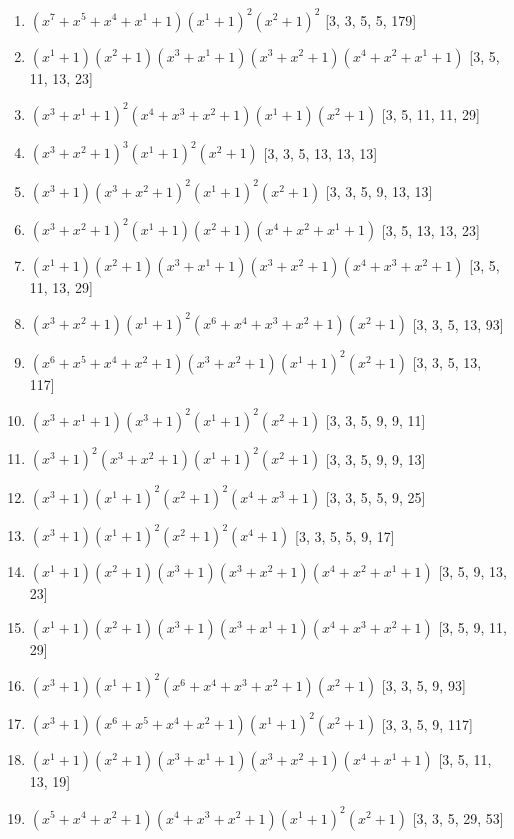 \documentclass[10pt,twocolumn]{article}
\begin{document}
\begin{enumerate}
\item $(x^{7} + x^{5} + x^{4} + x^{1} + 1)(x^{1} + 1)^{2}(x^{2} + 1)^{2}$  [3, 3, 5, 5, 179]
\item $(x^{1} + 1)(x^{2} + 1)(x^{3} + x^{1} + 1)(x^{3} + x^{2} + 1)(x^{4} + x^{2} + x^{1} + 1)$  [3, 5, 11, 13, 23]
\item $(x^{3} + x^{1} + 1)^{2}(x^{4} + x^{3} + x^{2} + 1)(x^{1} + 1)(x^{2} + 1)$  [3, 5, 11, 11, 29]
\item $(x^{3} + x^{2} + 1)^{3}(x^{1} + 1)^{2}(x^{2} + 1)$  [3, 3, 5, 13, 13, 13]
\item $(x^{3} + 1)(x^{3} + x^{2} + 1)^{2}(x^{1} + 1)^{2}(x^{2} + 1)$  [3, 3, 5, 9, 13, 13]
\item $(x^{3} + x^{2} + 1)^{2}(x^{1} + 1)(x^{2} + 1)(x^{4} + x^{2} + x^{1} + 1)$  [3, 5, 13, 13, 23]
\item $(x^{1} + 1)(x^{2} + 1)(x^{3} + x^{1} + 1)(x^{3} + x^{2} + 1)(x^{4} + x^{3} + x^{2} + 1)$  [3, 5, 11, 13, 29]
\item $(x^{3} + x^{2} + 1)(x^{1} + 1)^{2}(x^{6} + x^{4} + x^{3} + x^{2} + 1)(x^{2} + 1)$  [3, 3, 5, 13, 93]
\item $(x^{6} + x^{5} + x^{4} + x^{2} + 1)(x^{3} + x^{2} + 1)(x^{1} + 1)^{2}(x^{2} + 1)$  [3, 3, 5, 13, 117]
\item $(x^{3} + x^{1} + 1)(x^{3} + 1)^{2}(x^{1} + 1)^{2}(x^{2} + 1)$  [3, 3, 5, 9, 9, 11]
\item $(x^{3} + 1)^{2}(x^{3} + x^{2} + 1)(x^{1} + 1)^{2}(x^{2} + 1)$  [3, 3, 5, 9, 9, 13]
\item $(x^{3} + 1)(x^{1} + 1)^{2}(x^{2} + 1)^{2}(x^{4} + x^{3} + 1)$  [3, 3, 5, 5, 9, 25]
\item $(x^{3} + 1)(x^{1} + 1)^{2}(x^{2} + 1)^{2}(x^{4} + 1)$  [3, 3, 5, 5, 9, 17]
\item $(x^{1} + 1)(x^{2} + 1)(x^{3} + 1)(x^{3} + x^{2} + 1)(x^{4} + x^{2} + x^{1} + 1)$  [3, 5, 9, 13, 23]
\item $(x^{1} + 1)(x^{2} + 1)(x^{3} + 1)(x^{3} + x^{1} + 1)(x^{4} + x^{3} + x^{2} + 1)$  [3, 5, 9, 11, 29]
\item $(x^{3} + 1)(x^{1} + 1)^{2}(x^{6} + x^{4} + x^{3} + x^{2} + 1)(x^{2} + 1)$  [3, 3, 5, 9, 93]
\item $(x^{3} + 1)(x^{6} + x^{5} + x^{4} + x^{2} + 1)(x^{1} + 1)^{2}(x^{2} + 1)$  [3, 3, 5, 9, 117]
\item $(x^{1} + 1)(x^{2} + 1)(x^{3} + x^{1} + 1)(x^{3} + x^{2} + 1)(x^{4} + x^{1} + 1)$  [3, 5, 11, 13, 19]
\item $(x^{5} + x^{4} + x^{2} + 1)(x^{4} + x^{3} + x^{2} + 1)(x^{1} + 1)^{2}(x^{2} + 1)$  [3, 3, 5, 29, 53]

\end{enumerate}
\end{document}
